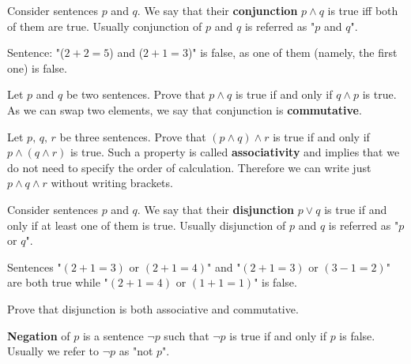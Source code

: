 \begin{definition}
  Consider sentences $p$ and $q$. We say that their \textbf{conjunction} $p\wedge q$ is true iff both of them are true. Usually conjunction of $p$ and $q$ is
  referred as "$p$ and $q$".
\end{definition}

\begin{example}
  Sentence: "($2+2=5$) and ($2+1=3$)" is false, as one of them (namely, the first one) is false.
\end{example}

\begin{exercise}
  Let $p$ and $q$ be two sentences. Prove that $p\wedge q$ is true if and only if $q\wedge p$ is true. As we can swap two elements, we say that conjunction is \textbf{commutative}.
\end{exercise}

\begin{exercise}
  Let $p,\, q,\, r$ be three sentences. Prove that $(p\wedge q)\wedge r$ is true if and only if $p\wedge (q\wedge r)$ is true. Such a property is called \textbf{associativity}
  and implies that we do not need to specify the order of calculation. Therefore we can write just $p\wedge q\wedge r$ without writing brackets.
\end{exercise}

\begin{definition}
  Consider sentences $p$ and $q$. We say that their \textbf{disjunction} $p\vee q$ is true if and only if at least one of them is true. Usually disjunction of $p$ and $q$ is
  referred as "$p$ or $q$".
\end{definition}

\begin{example}
  Sentences "$(2+1=3)$ or $(2+1=4)$" and "$(2+1=3)$ or $(3-1=2)$" are both true while "$(2+1=4)$ or $(1+1=1)$" is false.
\end{example}

\begin{exercise}
  Prove that disjunction is both associative and commutative.
\end{exercise}

\begin{definition}
  \textbf{Negation} of $p$ is a sentence $\neg p$ such that $\neg p$ is true if and only if $p$ is false. Usually we refer to $\neg p$ as "not $p$".
\end{definition}

